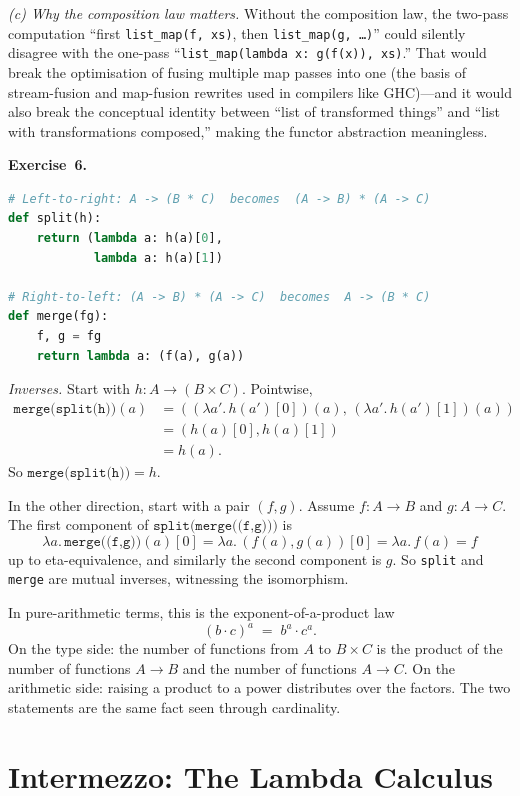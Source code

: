 \documentclass[11pt]{article}
\begin{document}
\emph{(c) Why the composition law matters.}  Without the composition
law, the two-pass computation ``first \texttt{list\_map(f, xs)}, then
\texttt{list\_map(g, \ldots)}'' could silently disagree with the
one-pass ``\texttt{list\_map(lambda x: g(f(x)), xs)}.''  That would
break the optimisation of fusing multiple map passes into one (the
basis of stream-fusion and map-fusion rewrites used in compilers like
GHC)---and it would also break the conceptual identity between ``list
of transformed things'' and ``list with transformations composed,''
making the functor abstraction meaningless.

\medskip
\textbf{Exercise~6.}
\begin{lstlisting}[language=Python]
# Left-to-right: A -> (B * C)  becomes  (A -> B) * (A -> C)
def split(h):
    return (lambda a: h(a)[0],
            lambda a: h(a)[1])

# Right-to-left: (A -> B) * (A -> C)  becomes  A -> (B * C)
def merge(fg):
    f, g = fg
    return lambda a: (f(a), g(a))
\end{lstlisting}

\emph{Inverses.}  Start with $h : A \to (B \times C)$.  Pointwise,
\[
\begin{aligned}
  \texttt{merge(split(h))}(a)
    &= ((\lambda a'.\, h(a')[0])(a),\,
        (\lambda a'.\, h(a')[1])(a)) \\
    &= (h(a)[0], h(a)[1]) \\
    &= h(a).
\end{aligned}
\]
So $\texttt{merge(split(h))} = h$.

In the other direction, start with a pair $(f, g)$. Assume
$f : A \to B$ and $g : A \to C$.  The first component of
$\texttt{split(merge((f,g)))}$ is
\[
  \lambda a.\, \texttt{merge((f,g))}(a)[0]
    = \lambda a.\, (f(a), g(a))[0]
    = \lambda a.\, f(a)
    = f
\]
up to eta-equivalence, and similarly the second component is $g$.  So
\texttt{split} and \texttt{merge} are mutual inverses, witnessing the
isomorphism.

In pure-arithmetic terms, this is the exponent-of-a-product law
\[
  (b \cdot c)^a \;=\; b^a \cdot c^a.
\]
On the type side: the number of functions from $A$ to $B \times C$ is
the product of the number of functions $A \to B$ and the number of
functions $A \to C$.  On the arithmetic side: raising a product to a
power distributes over the factors.  The two statements are the same
fact seen through cardinality.

\section*{Intermezzo: The Lambda Calculus}
\end{document}

